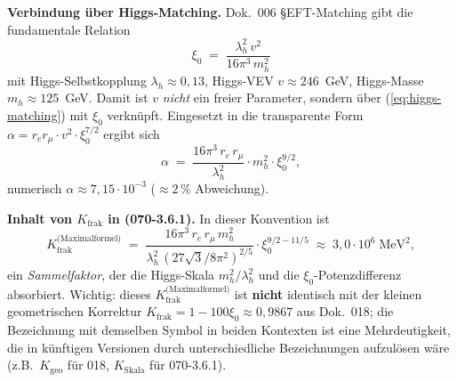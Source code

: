 \textbf{Verbindung über Higgs-Matching.}
Dok.~006 §EFT-Matching gibt die fundamentale Relation
\begin{equation}
  \xi_0 \;=\; \frac{\lambda_h^2\, v^2}{16\pi^3\, m_h^2}
  \label{eq:higgs-matching}
\end{equation}
mit Higgs-Selbstkopplung $\lambda_h \approx 0{,}13$, Higgs-VEV
$v \approx 246$~GeV, Higgs-Masse $m_h \approx 125$~GeV. Damit ist $v$
\emph{nicht} ein freier Parameter, sondern über (\ref{eq:higgs-matching})
mit $\xi_0$ verknüpft. Eingesetzt in die transparente Form
$\alpha = r_e r_\mu \cdot v^2 \cdot \xi_0^{7/2}$ ergibt sich
\begin{equation}
  \alpha \;=\;
  \frac{16\pi^3\,r_e\,r_\mu}{\lambda_h^2}
  \cdot m_h^2 \cdot \xi_0^{9/2},
\end{equation}
numerisch $\alpha \approx 7{,}15\cdot 10^{-3}$ ($\approx 2\,\%$ Abweichung).

\textbf{Inhalt von $K_{\text{frak}}$ in (070-3.6.1).}
In dieser Konvention ist
\begin{equation}
  K_{\text{frak}}^{\text{(Maximalformel)}}
  \;=\;
  \frac{16\pi^3\,r_e\,r_\mu\,m_h^2}{\lambda_h^2\,(27\sqrt{3}/8\pi^2)^{2/5}}
  \cdot \xi_0^{9/2 - 11/5}
  \;\approx\; 3{,}0 \cdot 10^{6}\;\text{MeV}^2,
\end{equation}
ein \emph{Sammelfaktor}, der die Higgs-Skala $m_h^2/\lambda_h^2$ und
die $\xi_0$-Potenzdifferenz absorbiert. Wichtig: dieses
$K_{\text{frak}}^{\text{(Maximalformel)}}$ ist \textbf{nicht} identisch
mit der kleinen geometrischen Korrektur
$K_{\text{frak}} = 1 - 100\xi_0 \approx 0{,}9867$ aus Dok.~018; die
Bezeichnung mit demselben Symbol in beiden Kontexten ist eine
Mehrdeutigkeit, die in künftigen Versionen durch unterschiedliche
Bezeichnungen aufzulösen wäre (z.B.\ $K_{\text{geo}}$ für 018,
$K_{\text{Skala}}$ für 070-3.6.1).


